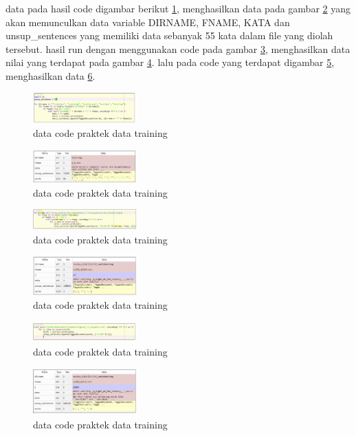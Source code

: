 \begin{enumerate}
        data pada hasil code digambar berikut \ref{l1}, menghasilkan data pada gambar \ref{l2} yang akan memunculkan data variable DIRNAME, FNAME, KATA dan unsup\_sentences yang memiliki data sebanyak 55 kata dalam file yang diolah tersebut. hasil run dengan menggunakan code pada gambar \ref{l3}, menghasilkan data nilai yang terdapat pada gambar \ref{l4}. lalu pada code yang terdapat digambar \ref{l5}, menghasilkan data \ref{l6}.
        \begin{figure}[H]
            \includegraphics[width=4cm]{figures/1174026/5/17.png}
            \centering
            \caption{data code praktek data training }
            \label{l1}
        \end{figure}
        \begin{figure}[H]
            \includegraphics[width=4cm]{figures/1174026/5/18.png}
            \centering
            \caption{data code praktek data training }
            \label{l2}
        \end{figure}
        \begin{figure}[H]
            \includegraphics[width=4cm]{figures/1174026/5/19.png}
            \centering
            \caption{data code praktek data training }
            \label{l3}
        \end{figure}
        \begin{figure}[H]
            \includegraphics[width=4cm]{figures/1174026/5/20.png}
            \centering
            \caption{data code praktek data training }
            \label{l4}
        \end{figure}
        \begin{figure}[H]
            \includegraphics[width=4cm]{figures/1174026/5/21.png}
            \centering
            \caption{data code praktek data training }
            \label{l5}
        \end{figure}
        \begin{figure}[H]
            \includegraphics[width=4cm]{figures/1174026/5/22.png}
            \centering
            \caption{data code praktek data training }
            \label{l6}
        \end{figure}
        

\end{enumerate}
